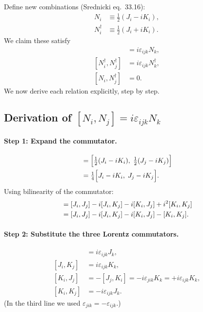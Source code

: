 \documentclass[12pt]{article}
\theoremstyle{remark}
\begin{document}
Define new combinations (Srednicki eq.~33.16):
\begin{align}
  N_i &\equiv \tfrac{1}{2}(J_i - iK_i),
  \label{eq:Ndef}\\
  N_i^\dagger &\equiv \tfrac{1}{2}(J_i + iK_i).
  \label{eq:Ndagdef}
\end{align}
We claim these satisfy
\begin{align}
  [N_i, N_j] &= i\varepsilon_{ijk}N_k,
  \label{eq:NN}\\
  [N_i^\dagger, N_j^\dagger] &= i\varepsilon_{ijk}N_k^\dagger,
  \label{eq:NdagNdag}\\
  [N_i, N_j^\dagger] &= 0.
  \label{eq:NNdag}
\end{align}
We now derive each relation explicitly, step by step.

\subsection{Derivation of \texorpdfstring{$[N_i,N_j]=i\varepsilon_{ijk}N_k$}{[N,N]=iepsN}}

\paragraph{Step 1: Expand the commutator.}
\begin{align}
  [N_i, N_j]
  &= \Bigl[\tfrac{1}{2}(J_i - iK_i),\; \tfrac{1}{2}(J_j - iK_j)\Bigr]
  \notag\\
  &= \tfrac{1}{4}\Bigl[J_i - iK_i,\; J_j - iK_j\Bigr].
\end{align}
Using bilinearity of the commutator:
\begin{align}
  [J_i - iK_i,\; J_j - iK_j]
  &= [J_i, J_j]
     - i[J_i, K_j]
     - i[K_i, J_j]
     + i^2[K_i, K_j]
  \notag\\
  &= [J_i, J_j]
     - i[J_i, K_j]
     - i[K_i, J_j]
     - [K_i, K_j].
  \label{eq:NN_expand}
\end{align}

\paragraph{Step 2: Substitute the three Lorentz commutators.}
\begin{align*}
  [J_i, J_j] &= i\varepsilon_{ijk}J_k,\\
  [J_i, K_j] &= i\varepsilon_{ijk}K_k,\\
  [K_i, J_j] &= -[J_j, K_i] = -i\varepsilon_{jik}K_k = +i\varepsilon_{ijk}K_k,\\
  [K_i, K_j] &= -i\varepsilon_{ijk}J_k.
\end{align*}
(In the third line we used $\varepsilon_{jik} = -\varepsilon_{ijk}$.)
\end{document}
